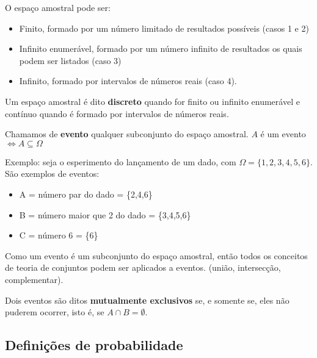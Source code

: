 \documentclass[10pt]{article}
\begin{document}
\par O espaço amostral pode ser:
\begin{itemize}
    \item Finito, formado por um número limitado de resultados possíveis (casos 1 e 2)
    \item Infinito enumerável, formado por um número infinito de resultados os quais
        podem ser listados (caso 3)
    \item Infinito, formado por intervalos de números reais (caso 4).
\end{itemize}

\par Um espaço amostral é dito \textbf{discreto} quando for finito ou infinito enumerável
e contínuo quando é formado por intervalos de números reais.

\par Chamamos de \textbf{evento} qualquer subconjunto do espaço amostral.
\begin{math} A \end{math} é um evento \begin{math} \iff A \subseteq \Omega \end{math}

\par Exemplo: seja o esperimento do lançamento de um dado, com 
    \begin{math}\Omega = \{1,2,3,4,5,6\}\end{math}.\\ São exemplos de eventos:
\begin{itemize}
    \item A = número par do dado = \{2,4,6\}
    \item B = número maior que 2 do dado = \{3,4,5,6\}
    \item C = número 6 = \{6\}
\end{itemize}
    \par Como um evento é um subconjunto do espaço amostral, então todos os conceitos
    de teoria de conjuntos podem ser aplicados a eventos. (união, intersecção, complementar).
    \par Dois eventos são ditos \textbf{mutualmente exclusivos} se, e somente se, eles não
    puderem ocorrer, isto é, se \begin{math}A \cap B = \emptyset \end{math}.
\subsection{Definições de probabilidade}
\end{document}
